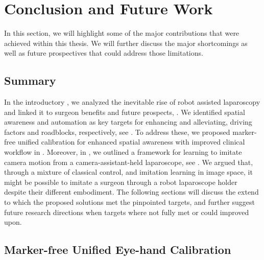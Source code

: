 \chapter[Conclusions and Future Work]{Conclusion and Future Work}
\label{chap:conclusion}
\minitoc

\newpage

In this section, we will highlight some of the major contributions that were achieved within this thesis. We will further discuss the major shortcomings as well as future prospectives that could address those limitations. 

\section{Summary}
In the introductory , we analyzed the inevitable rise of robot assisted laparoscopy and linked it to surgeon benefits and future prospects, . We identified spatial awareness and automation as key targets for enhancing and alleviating, driving factors and roadblocks, respectively, see . To address these, we proposed marker-free unified calibration for enhanced spatial awareness with improved clinical workflow in . Moreover, in , we outlined a framework for learning to imitate camera motion from a camera-assistant-held laparoscope, see . We argued that, through a mixture of classical control, and imitation learning in image space, it might be possible to imitate a surgeon through a robot laparoscope holder despite their different embodiment. The following sections will discuss the extend to which the proposed solutions met the pinpointed targets, and further suggest future research directions when targets where not fully met or could improved upon.

\section{Marker-free Unified Eye-hand Calibration}
\label{con:sec:marker_free}


